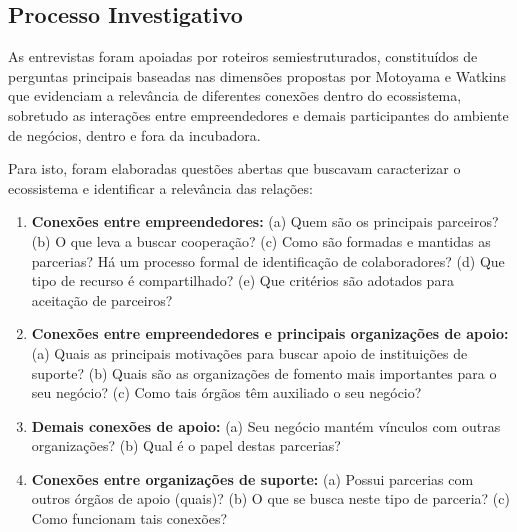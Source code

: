 \documentclass{sig-alternate-05-2015}
\begin{document}
\subsection{Processo Investigativo}

As entrevistas foram apoiadas por roteiros semiestruturados, constituídos de perguntas principais baseadas nas dimensões propostas por Motoyama e Watkins \cite{motoyama-waltins-2014} que evidenciam a relevância de diferentes conexões dentro do ecossistema, sobretudo as interações entre empreendedores e demais participantes do ambiente de negócios, dentro e fora da incubadora. 

Para isto, foram elaboradas questões abertas que buscavam caracterizar o ecossistema e identificar a relevância das relações: 
\begin{enumerate}
	\item \textbf{Conexões entre empreendedores: }(a) Quem são os principais parceiros? (b) O que leva a buscar cooperação? (c) Como são formadas e mantidas as parcerias? Há um processo formal de identificação de colaboradores? (d) Que tipo de recurso é compartilhado? (e) Que critérios são adotados para aceitação de parceiros? 
	
	\item \textbf{Conexões entre empreendedores e principais organizações de apoio: } (a) Quais as principais motivações para buscar apoio de instituições de suporte? (b) Quais são as organizações de fomento mais importantes para o seu negócio? (c) Como tais órgãos têm auxiliado o seu negócio? 
	
	\item \textbf{Demais conexões de apoio: } (a) Seu negócio mantém vínculos com outras organizações? (b) Qual é o papel destas parcerias? 
	
	\item \textbf{Conexões entre organizações de suporte:} (a) Possui parcerias com outros órgãos de apoio (quais)? (b) O que se busca neste tipo de parceria? (c) Como funcionam tais conexões?
\end{enumerate}
\end{document}
